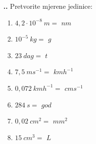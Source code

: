 
\noindent 
\textbf{
\thecjelina.\thezadatak.}
Pretvorite mjerene jedinice:
\begin{enumerate}[label=\alph*)]
  \item $4,2\cdot 10^{-8}\ m=$ \hspace{1.5cm} $ nm $
  \item $10^{-5}\ kg =$ \hspace{1.5cm} $ g$
  \item $23\ dag =$ \hspace{1.5cm} $ t$  
  \item $7,5\ ms^{-1} = $ \hspace{1.5cm} $ kmh^{-1}$
  \item $0,072\ kmh^{-1} =$ \hspace{1.5cm} $cms^{-1}$
  \item $284\ s =$ \hspace{1.5cm} $god $
  \item $0,02\ cm^2=$ \hspace{1.5cm} $mm^2 $
  \item $15\ cm^3 =$ \hspace{1.5cm} $ L$
\end{enumerate}
